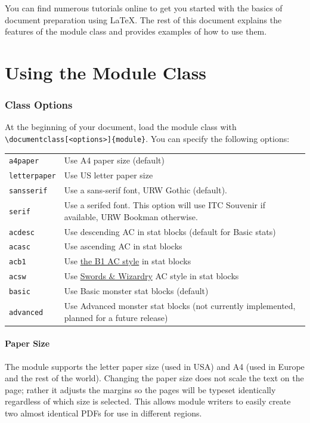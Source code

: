 \documentclass[letterpaper,serif]{module}
\begin{document}
You can find numerous tutorials online to get you started with the basics of document preparation using \LaTeX.
The rest of this document explains the features of the module class and provides examples of how to use them.

\part{Using the Module Class}

\section{Class Options}

At the beginning of your document, load the module class with \verb|\documentclass[<options>]{module}|. You can
specify the following options:

\begin{tabularx}{\linewidth}{lX}
\verb|a4paper|     & Use A4 paper size (default)\\
\verb|letterpaper| & Use US letter paper size\\
\verb|sansserif|   & Use a sans-serif font, URW Gothic (default).\\
\verb|serif|       & Use a serifed font. This option will use ITC Souvenir if available, URW Bookman otherwise.\\
\verb|acdesc|      & Use descending AC in stat blocks (default for Basic stats)\\
\verb|acasc|       & Use ascending AC in stat blocks\\
\verb|acb1|        & Use \href{http://zenopusarchives.blogspot.com/2014/02/ascending-ac-in-holmes-basic.html}{the B1 AC style} in stat blocks\\
\verb|acsw|        & Use \href{http://www.swordsandwizardry.com/}{Swords \& Wizardry} AC style in stat blocks\\
\verb|basic|       & Use Basic monster stat blocks (default)\\
\verb|advanced|    & Use Advanced monster stat blocks (not currently implemented, planned for a future release)\\
\end{tabularx}

\subsection*{Paper Size}

The module supports the letter paper size (used in USA) and A4 (used in Europe and the rest of the world). Changing the paper size
does not scale the text on the page; rather it adjusts the margins so the pages will be typeset identically regardless
of which size is selected. This allows module writers to easily create two almost identical PDFs for use in different regions.
\end{document}
